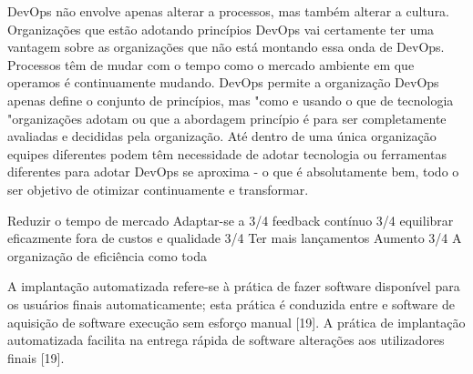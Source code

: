 DevOps não envolve apenas
alterar a processos, mas também alterar a cultura.
Organizações que estão adotando princípios DevOps
vai certamente ter uma vantagem sobre as organizações
que não está montando essa onda de DevOps.
Processos têm de mudar com o tempo como o mercado
ambiente em que operamos é continuamente
mudando. DevOps permite a organização
DevOps apenas define o conjunto de princípios, mas "como
e usando o que de tecnologia "organizações adotam
ou que a abordagem princípio é para ser completamente
avaliadas e decididas pela organização. Até
dentro de uma única organização equipes diferentes podem
têm necessidade de adotar tecnologia ou ferramentas diferentes para
adotar DevOps se aproxima - o que é absolutamente
bem, todo o ser objetivo de otimizar continuamente
e transformar. \cite{7173368}

Reduzir o tempo de mercado
Adaptar-se a 3/4 feedback contínuo
3/4 equilibrar eficazmente fora de custos e
qualidade
3/4 Ter mais
lançamentos
Aumento 3/4
A organização de
eficiência como toda \cite{7173368}

A implantação automatizada refere-se à prática de fazer
software disponível para os usuários finais automaticamente; esta prática é
conduzida entre e software de aquisição de software
execução sem esforço manual [19]. A prática de
implantação automatizada facilita na entrega rápida de software
alterações aos utilizadores finais [19]. \cite{7284592}


